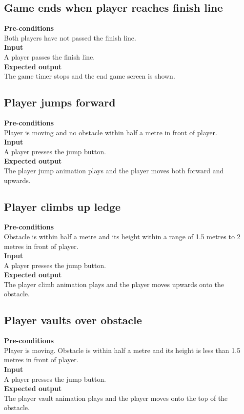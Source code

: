 \documentclass[a4paper,10pt]{article}
\begin{document}
    \subsection{Game ends when player reaches finish line}
        \textbf{Pre-conditions}\\
        Both players have not passed the finish line. 
        \smallskip\\\textbf{Input}\\
        A player passes the finish line.
        \smallskip\\\textbf{Expected output}\\
        The game timer stops and the end game screen is shown.
        
    \subsection{Player jumps forward}
        \textbf{Pre-conditions}\\
        Player is moving and no obstacle within half a metre in front of player. 
        \smallskip\\\textbf{Input}\\
        A player presses the jump button.
        \smallskip\\\textbf{Expected output}\\
        The player jump animation plays and the player moves both forward and upwards. 
        
    \subsection{Player climbs up ledge}
    \textbf{Pre-conditions}\\
    Obstacle is within half a metre and its height within a range of 1.5 metres to 2 metres in front of player. 
    \smallskip\\\textbf{Input}\\
    A player presses the jump button.
    \smallskip\\\textbf{Expected output}\\
    The player climb animation plays and the player moves upwards onto the obstacle.
    
    \subsection{Player vaults over obstacle}
    \textbf{Pre-conditions}\\
    Player is moving. Obstacle is within half a metre and its height is less than 1.5 metres in front of player. 
    \smallskip\\\textbf{Input}\\
    A player presses the jump button.
    \smallskip\\\textbf{Expected output}\\
    The player vault animation plays and the player moves onto the top of the obstacle.
    
\end{document}
